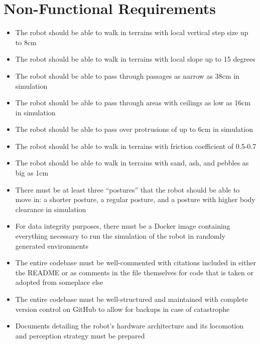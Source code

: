 
\section{Non-Functional Requirements}

\begin{itemize}
    \item The robot should be able to walk in terrains with local vertical step size up to 8cm
    \item The robot should be able to walk in terrains with local slope up to 15 degrees
    \item The robot should be able to pass through passages as narrow as 38cm in simulation
    \item The robot should be able to pass through areas with ceilings as low as 16cm in simulation
    \item The robot should be able to pass over protrusions of up to 6cm in simulation
    \item The robot should be able to walk in terrains with friction coefficient of 0.5-0.7
    \item The robot should be able to walk in terrains with sand, ash, and pebbles as big as 1cm
    \item There must be at least three ``postures'' that the robot should be able to move in: a shorter posture, a regular posture, and a posture with higher body clearance in simulation
    \item For data integrity purposes, there must be a Docker image containing everything necessary to run the simulation of the robot in randomly generated environments
    \item The entire codebase must be well-commented with citations included in either the README or as comments in the file themselves for code that is taken or adopted from someplace else
    \item The entire codebase must be well-structured and maintained with complete version control on GitHub to allow for backups in case of catastrophe
    \item Documents detailing the robot's hardware architecture and its locomotion and perception strategy must be prepared
\end{itemize}

